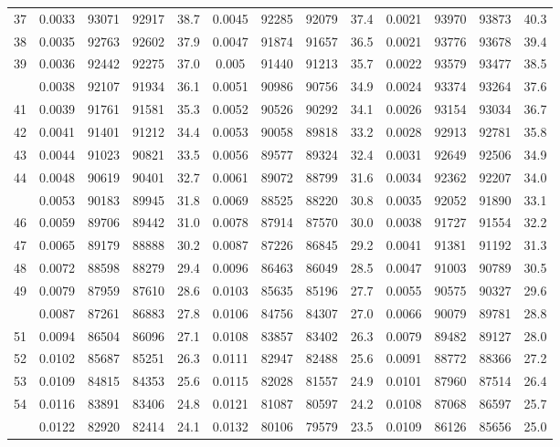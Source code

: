 \documentclass[
  14pt,
]{article}
\begin{document}
\begin{longtable}[t]{lcccccccccccc}
37 & 0.0033 & 93071 & 92917 & 38.7 & 0.0045 & 92285 & 92079 & 37.4 & 0.0021 & 93970 & 93873 & 40.3\\
38 & 0.0035 & 92763 & 92602 & 37.9 & 0.0047 & 91874 & 91657 & 36.5 & 0.0021 & 93776 & 93678 & 39.4\\
39 & 0.0036 & 92442 & 92275 & 37.0 & 0.005 & 91440 & 91213 & 35.7 & 0.0022 & 93579 & 93477 & 38.5\\
\addlinespace
40 & 0.0038 & 92107 & 91934 & 36.1 & 0.0051 & 90986 & 90756 & 34.9 & 0.0024 & 93374 & 93264 & 37.6\\
41 & 0.0039 & 91761 & 91581 & 35.3 & 0.0052 & 90526 & 90292 & 34.1 & 0.0026 & 93154 & 93034 & 36.7\\
42 & 0.0041 & 91401 & 91212 & 34.4 & 0.0053 & 90058 & 89818 & 33.2 & 0.0028 & 92913 & 92781 & 35.8\\
43 & 0.0044 & 91023 & 90821 & 33.5 & 0.0056 & 89577 & 89324 & 32.4 & 0.0031 & 92649 & 92506 & 34.9\\
44 & 0.0048 & 90619 & 90401 & 32.7 & 0.0061 & 89072 & 88799 & 31.6 & 0.0034 & 92362 & 92207 & 34.0\\
\addlinespace
45 & 0.0053 & 90183 & 89945 & 31.8 & 0.0069 & 88525 & 88220 & 30.8 & 0.0035 & 92052 & 91890 & 33.1\\
46 & 0.0059 & 89706 & 89442 & 31.0 & 0.0078 & 87914 & 87570 & 30.0 & 0.0038 & 91727 & 91554 & 32.2\\
47 & 0.0065 & 89179 & 88888 & 30.2 & 0.0087 & 87226 & 86845 & 29.2 & 0.0041 & 91381 & 91192 & 31.3\\
48 & 0.0072 & 88598 & 88279 & 29.4 & 0.0096 & 86463 & 86049 & 28.5 & 0.0047 & 91003 & 90789 & 30.5\\
49 & 0.0079 & 87959 & 87610 & 28.6 & 0.0103 & 85635 & 85196 & 27.7 & 0.0055 & 90575 & 90327 & 29.6\\
\addlinespace
50 & 0.0087 & 87261 & 86883 & 27.8 & 0.0106 & 84756 & 84307 & 27.0 & 0.0066 & 90079 & 89781 & 28.8\\
51 & 0.0094 & 86504 & 86096 & 27.1 & 0.0108 & 83857 & 83402 & 26.3 & 0.0079 & 89482 & 89127 & 28.0\\
52 & 0.0102 & 85687 & 85251 & 26.3 & 0.0111 & 82947 & 82488 & 25.6 & 0.0091 & 88772 & 88366 & 27.2\\
53 & 0.0109 & 84815 & 84353 & 25.6 & 0.0115 & 82028 & 81557 & 24.9 & 0.0101 & 87960 & 87514 & 26.4\\
54 & 0.0116 & 83891 & 83406 & 24.8 & 0.0121 & 81087 & 80597 & 24.2 & 0.0108 & 87068 & 86597 & 25.7\\
\addlinespace
55 & 0.0122 & 82920 & 82414 & 24.1 & 0.0132 & 80106 & 79579 & 23.5 & 0.0109 & 86126 & 85656 & 25.0\\

\end{longtable}
\end{document}

